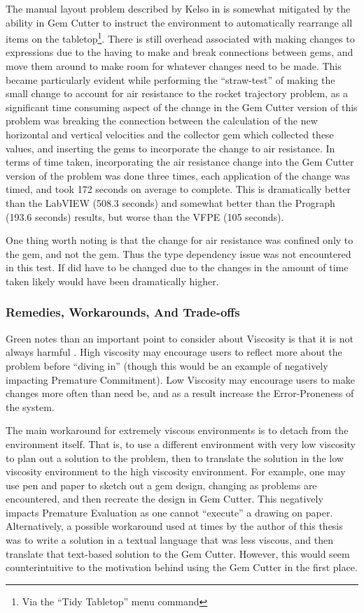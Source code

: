 The manual layout problem described by Kelso in \cite{Kelso02} is somewhat mitigated by the ability in Gem Cutter to instruct the environment to automatically rearrange all items on the tabletop\footnote{Via the ``Tidy Tabletop'' menu command}.  There is still overhead associated with making changes to expressions due to the having to make and break connections between gems, and move them around to make room for whatever changes need to be made.  This became particularly evident while performing the ``straw-test'' of making the small change to account for air resistance to the rocket trajectory problem, as a significant time consuming aspect of the change in the Gem Cutter version of this problem was breaking the connection between the calculation of the new horizontal and vertical velocities and the collector gem which collected these values, and inserting the gems to incorporate the change to air resistance.  In terms of time taken, incorporating the air resistance change into the Gem Cutter version of the problem was done three times, each application of the change was timed, and took 172 seconds on average to complete.  This is dramatically better than the LabVIEW (508.3 seconds) and somewhat better than the Prograph (193.6 seconds) results, but worse than the VFPE (105 seconds).

One thing worth noting is that the change for air resistance was confined only to the  gem, and not the  gem.  Thus the type dependency issue was not encountered in this test.  If  did have to be changed due to the changes in  the amount of time taken likely would have been dramatically higher.

\subsubsection{Remedies, Workarounds, And Trade-offs}

Green notes than an important point to consider about Viscosity is that it is not always harmful \cite{green98}.  High viscosity may encourage users to reflect more about the problem before ``diving in'' (though this would be an example of negatively impacting Premature Commitment).  Low Viscosity may encourage users to make changes more often than need be, and as a result increase the Error-Proneness of the system.

The main workaround for extremely viscous environments is to detach from the environment itself.  That is, to use a different environment with very low viscosity to plan out a solution to the problem, then to translate the solution in the low viscosity environment to the high viscosity environment.  For example, one may use pen and paper to sketch out a gem design, changing as problems are encountered, and then recreate the design in Gem Cutter.  This negatively impacts Premature Evaluation as one cannot ``execute'' a drawing on paper.  Alternatively, a possible workaround used at times by the author of this thesis was to write a solution in a textual language that was less viscous, and then translate that text-based solution to the Gem Cutter.  However, this would seem counterintuitive to the motivation behind using the Gem Cutter in the first place.

